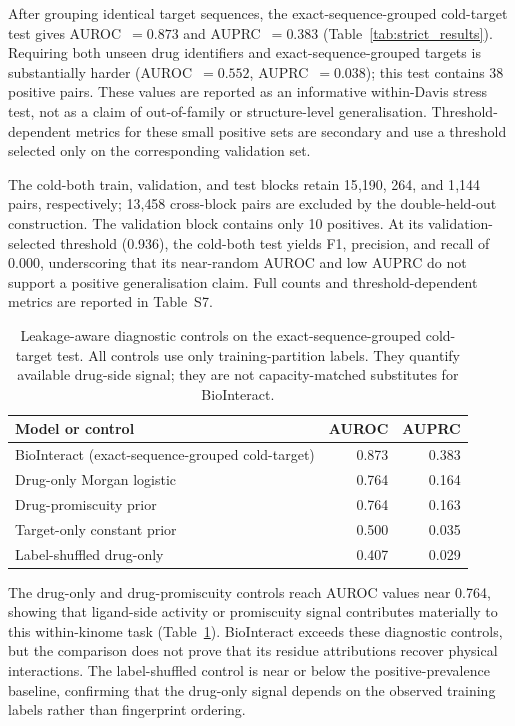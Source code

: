 \documentclass[fleqn,10pt]{wlscirep}
\begin{document}
After grouping identical target sequences, the exact-sequence-grouped cold-target test gives
AUROC~$=0.873$ and AUPRC~$=0.383$ (Table~\ref{tab:strict_results}).  Requiring
both unseen drug identifiers and exact-sequence-grouped targets is substantially
harder (AUROC~$=0.552$, AUPRC~$=0.038$); this test contains 38 positive pairs.
These values are reported as an informative within-Davis stress test, not as a
claim of out-of-family or structure-level generalisation.  Threshold-dependent
metrics for these small positive sets are secondary and use a threshold selected
only on the corresponding validation set.

The cold-both train, validation, and test blocks retain 15{,}190, 264, and
1{,}144 pairs, respectively; 13{,}458 cross-block pairs are excluded by the
double-held-out construction. The validation block contains only 10 positives.
At its validation-selected threshold (0.936), the cold-both test yields F1,
precision, and recall of 0.000, underscoring that its near-random AUROC and low
AUPRC do not support a positive generalisation claim. Full counts and
threshold-dependent metrics are reported in Table~S7.

\begin{table}[htbp]
\centering
\caption{Leakage-aware diagnostic controls on the exact-sequence-grouped
  cold-target test. All controls use only training-partition labels. They
  quantify available drug-side signal; they are not capacity-matched substitutes
  for BioInteract.}
\label{tab:diagnostic_controls}
\begin{tabular}{lrr}
\toprule
\textbf{Model or control} & \textbf{AUROC} & \textbf{AUPRC} \\
\midrule
BioInteract (exact-sequence-grouped cold-target) & 0.873 & 0.383 \\
Drug-only Morgan logistic         & 0.764 & 0.164 \\
Drug-promiscuity prior            & 0.764 & 0.163 \\
Target-only constant prior        & 0.500 & 0.035 \\
Label-shuffled drug-only          & 0.407 & 0.029 \\
\bottomrule
\end{tabular}
\end{table}

The drug-only and drug-promiscuity controls reach AUROC values near 0.764,
showing that ligand-side activity or promiscuity signal contributes materially
to this within-kinome task (Table~\ref{tab:diagnostic_controls}).  BioInteract
exceeds these diagnostic controls, but the comparison does not prove that its
residue attributions recover physical interactions.  The label-shuffled control
is near or below the positive-prevalence baseline, confirming that the drug-only
signal depends on the observed training labels rather than fingerprint ordering.
\end{document}
